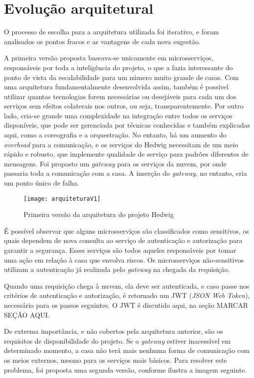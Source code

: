 \section{Evolução arquitetural}
O processo de escolha para a arquitetura utilizada foi iterativo, e foram analisados os pontos fracos e as vantagens de cada nova sugestão.

A primeira versão proposta baseava-se unicamente em microsserviços, responsáveis por toda a inteligência do projeto, o que a fazia interessante do ponto de vista da escalabilidade para um número muito grande de casas. Com uma arquitetura fundamentalmente desenvolvida assim, também é possível utilizar quantas tecnologias forem necessárias ou desejáveis para cada um dos serviços sem efeitos colaterais nos outros, ou seja, transparentemente. Por outro lado, cria-se grande uma complexidade na integração entre todos os serviços disponíveis, que pode ser gerenciada por técnicas conhecidas e também explicadas aqui, como a coreografia e a orquestração. No entanto, há um aumento do \textit{overhead} para a comunicação, e os serviços do Hedwig necessitam de um meio rápido e robusto, que implemente qualidade de serviço para padrões diferentes de mensagens. Foi proposto um \textit{gateway} para os serviços da nuvem, por onde passaria toda a comunicação com a casa. A inserção do \textit{gateway}, no entanto, cria um ponto único de falha.

\begin{figure}[H]
	\centering
	\caption{Primeira versão da arquitetura do projeto Hedwig}
  \texttt{[image: arquiteturaV1]}
\label{fig:arquiteturaV1}
\end{figure}

É possível observar que alguns microsserviços são classificados como sensitivos, os quais dependem de nova consulta ao serviço de autenticação e autorização para garantir a segurança. Esses serviços são todos aqueles responsáveis por tomar uma ação em relação à casa que envolva riscos. Os microsserviços não-sensitivos utilizam a autenticação já realizada pelo \textit{gateway} na chegada da requisição.

Quando uma requisição chega à nuvem, ela deve ser autenticada, e caso passe nos critérios de autenticação e autorização, é retornado um JWT (\textit{JSON Web Token}), necessário para os passos seguintes. O JWT é discutido aqui, na seção MARCAR SEÇÃO AQUI. %

De extrema importância, e não cobertos pela arquitetura anterior, são os requisitos de disponibilidade do projeto. Se o \textit{gateway} estiver inacessível em determinado momento, a casa não terá mais nenhuma forma de comunicação com os meios externos, mesmo para os serviços mais básicos. Para resolver este problema, foi proposta uma segunda versão, conforme ilustra a imagem seguinte.

